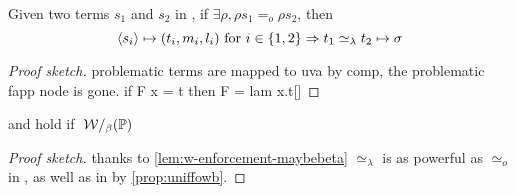 \documentclass[sigconf,natbib=false,review]{acmart}
\newcommand{\EqualRel}{\ensuremath{=}}
\newcommand{\UnifRel}{\ensuremath{\simeq}}
\newcommand{\Uo}{\texorpdfstring{\ensuremath{\UnifRel_o}\xspace}{unif\_o}}
\newcommand{\Eo}{\ensuremath{\EqualRel_o}\xspace}
\newcommand{\Ue}{\ensuremath{\UnifRel_\lambda}\xspace}
\newcommand{\foUnifPb}{\ensuremath{\mathbb{P}}\xspace}
\begin{document}
\begin{lemma}\label{lem:w-enforcement-maybebeta}
  Given two terms $s_1$ and $s_2$ in \maybebeta, if $\exists \rho, \rho s_1 \Eo \rho s_2$,
  then 
  $$
    \C{s_i}{t_i}{m_i}{l_i} ~\mathrm{for}~ i \in \{ 1,2 \} \Rightarrow
    t_1 \Ue t_2 \mapsto \sigma
  $$ 
\end{lemma}
\begin{proof}[Proof sketch]
  problematic terms are mapped to uva by comp,
  the problematic fapp node is gone.
  if F x = t then  F = lam x.t[]
\end{proof}

\begin{theorem}  and
 hold if $\;\wellb/_\beta(\foUnifPb)$
\end{theorem}
\begin{proof}[Proof sketch] thanks to \cref{lem:w-enforcement-maybebeta}
  \Ue is as powerful as \Uo in \maybebeta, as well as in \wellb by
  \cref{prop:uniffowb}.
\end{proof}






\end{document}

